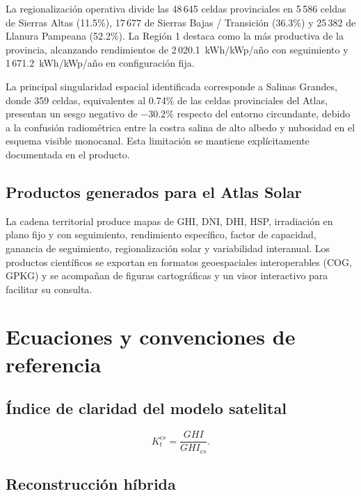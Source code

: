\documentclass[11pt,a4paper]{article}
\begin{document}
La regionalización operativa divide las 48\,645 celdas provinciales en 5\,586 celdas de Sierras Altas (11.5\%), 17\,677 de Sierras Bajas / Transición (36.3\%) y 25\,382 de Llanura Pampeana (52.2\%). La Región 1 destaca como la más productiva de la provincia, alcanzando rendimientos de 2\,020.1~kWh/kWp/año con seguimiento y 1\,671.2~kWh/kWp/año en configuración fija.

La principal singularidad espacial identificada corresponde a Salinas Grandes, donde 359 celdas, equivalentes al 0.74\% de las celdas provinciales del Atlas, presentan un sesgo negativo de $-30.2\%$ respecto del entorno circundante, debido a la confusión radiométrica entre la costra salina de alto albedo y nubosidad en el esquema visible monocanal. Esta limitación se mantiene explícitamente documentada en el producto.

\subsection{Productos generados para el Atlas Solar}

La cadena territorial produce mapas de GHI, DNI, DHI, HSP, irradiación en plano fijo y con seguimiento, rendimiento específico, factor de capacidad, ganancia de seguimiento, regionalización solar y variabilidad interanual. Los productos científicos se exportan en formatos geoespaciales interoperables (COG, GPKG) y se acompañan de figuras cartográficas y un visor interactivo para facilitar su consulta.



\appendix

\section{Ecuaciones y convenciones de referencia}

\subsection{Índice de claridad del modelo satelital}

\[
K_t^{cs}=\frac{GHI}{GHI_{cs}}.
\]

\subsection{Reconstrucción híbrida}
\end{document}
